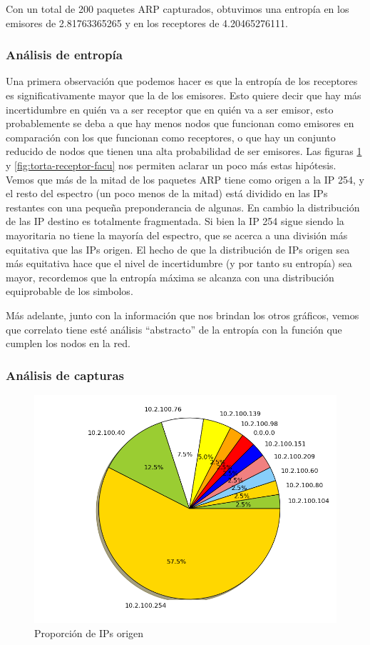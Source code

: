 Con un total de 200 paquetes ARP capturados, obtuvimos una entropía en los
emisores de 2.81763365265 y en los receptores de 4.20465276111.

\subsubsection{Análisis de entropía}
Una primera observación que podemos hacer es que la entropía de los receptores es significativamente mayor que la de los emisores. Esto quiere decir que hay más incertidumbre en quién va a ser receptor que en quién va a ser emisor, esto probablemente se deba a que hay menos nodos que funcionan como emisores en comparación con los que funcionan como receptores, o que hay un conjunto reducido de nodos que tienen una alta probabilidad de ser emisores.
Las figuras \ref{fig:torta-emisor-facu} y \ref{fig:torta-receptor-facu} nos permiten aclarar un poco más estas hipótesis. Vemos que más de la mitad de los paquetes ARP tiene como origen a la IP 254, y el resto del espectro (un poco menos de la mitad) está dividido en las IPs restantes con una pequeña preponderancia de algunas. En cambio la distribución de las IP destino es totalmente fragmentada. Si bien la IP 254 sigue siendo la mayoritaria no tiene la mayoría del espectro, que se acerca a una división más equitativa que las IPs origen. El hecho de que la distribución de IPs origen sea más equitativa hace que el nivel de incertidumbre (y por tanto su entropía) sea mayor, recordemos que la entropía máxima se alcanza con una distribución equiprobable de los simbolos.

Más adelante, junto con la información que nos brindan los otros gráficos, vemos que correlato tiene esté análisis ``abstracto'' de la entropía con la función que cumplen los nodos en la red.

\subsubsection{Análisis de capturas}
\begin{figure}[!h]
  \includegraphics[width=\textwidth,keepaspectratio]{graph/emisores_facu.png}
  \caption{Proporción de IPs origen}
  \label{fig:torta-emisor-facu}
\end{figure}

